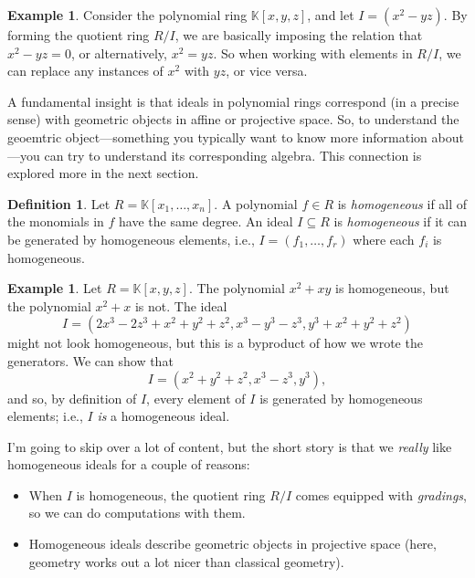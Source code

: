 \documentclass[12pt,a4paper]{article}
\newcommand{\KK}{\mathbb{K}}
\theoremstyle{definition}
\newtheorem{definition}[theorem]{Definition}
\newtheorem{example}[theorem]{Example}
\numberwithin{equation}{section}
\begin{document}
\begin{example}
    Consider the polynomial ring $\KK[x,y,z]$, and let $I = (x^2 - yz)$.
    By forming the quotient ring $R/I$, we are basically imposing the relation that $x^2 - yz = 0$, or alternatively, $x^2 = yz$.
    So when working with elements in $R/I$, we can replace any instances of $x^2$ with $yz$, or vice versa.
\end{example}

A fundamental insight is that ideals in polynomial rings correspond (in a precise sense) with geometric objects in affine or projective space.
So, to understand the geoemtric object---something you typically want to know more information about---you can try to understand its corresponding algebra.
This connection is explored more in the next section.

\begin{definition}
    Let $R = \KK[x_1,\dots,x_n]$.
    A polynomial $f \in R$ is \emph{homogeneous} if all of the monomials in $f$ have the same degree.
    An ideal $I \subseteq R$ is \emph{homogeneous} if it can be generated by homogeneous elements, i.e., $I = (f_1,\dots,f_r)$ where each $f_i$ is homogeneous.
\end{definition}

\begin{example}
    Let $R = \KK[x,y,z]$.
    The polynomial $x^2 + xy$ is homogeneous, but the polynomial $x^2 + x$ is not.
    The ideal
    \begin{equation*}
        I = (2x^3 - 2z^3 + x^2 + y^2 + z^2, x^3 - y^3 - z^3, y^3 + x^2 + y^2 + z^2)
    \end{equation*}
    might not look homogeneous, but this is a byproduct of how we wrote the generators.
    We can show that
    \begin{equation*}
        I = (x^2 + y^2 + z^2, x^3 - z^3, y^3),
    \end{equation*}
    and so, by definition of $I$, every element of $I$ is generated by homogeneous elements; i.e., $I$ \emph{is} a homogeneous ideal.
\end{example}

I'm going to skip over a lot of content, but the short story is that we \emph{really} like homogeneous ideals for a couple of reasons:
\begin{itemize}
    \item When $I$ is homogeneous, the quotient ring $R/I$ comes equipped with \emph{gradings}, so we can do computations with them.

    \item Homogeneous ideals describe geometric objects in projective space (here, geometry works out a lot nicer than classical geometry).
\end{itemize}
\end{document}
